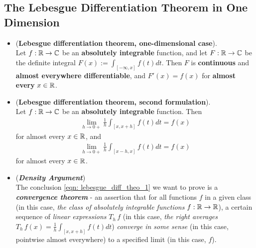 \documentclass[11pt]{article}
\begin{document}
\subsection{The Lebesgue Differentiation Theorem in One Dimension}
\begin{itemize}
\item \begin{theorem} (\textbf{Lebesgue differentiation theorem, one-dimensional case}). \\
Let $f: {\mathbb R} \rightarrow {\mathbb C}$ be an \textbf{absolutely integrable} function, and let $F: {\mathbb R} \rightarrow {\mathbb C}$ be the definite integral $F(x) := \int_{[-\infty,x]} f(t) dt$. Then $F$ is \textbf{continuous} and \textbf{almost everywhere differentiable}, and $F'(x) = f(x)$ for \textbf{almost every} $x \in {\mathbb R}$.
\end{theorem}

\item \begin{theorem} (\textbf{Lebesgue differentiation theorem, second formulation}). \\
Let $f: {\mathbb R} \rightarrow {\mathbb C}$ be an \textbf{absolutely integrable} function. Then
\begin{align}
 \lim\limits_{h\rightarrow 0+}\frac{1}{h} \int_{[x,x+h]} f(t) dt = f(x) \label{eqn: lebesgue_diff_theo_1}
\end{align} for almost every $x \in {\mathbb R}$, and
\begin{align}
 \lim\limits_{h\rightarrow 0+}\frac{1}{h} \int_{[x-h,x]} f(t) dt = f(x) \label{eqn: lebesgue_diff_theo_2}
\end{align} for almost every $x \in {\mathbb R}$.
\end{theorem}

\item \begin{remark} (\emph{\textbf{Density Argument}}) \citep{tao2011introduction} \\
The conclusion \eqref{eqn: lebesgue_diff_theo_1} we want to prove is a \emph{\textbf{convergence theorem}} - an assertion that for all functions $f$ in a given class (in this case, \emph{the class of absolutely integrable functions} $f : {\mathbb R} \rightarrow {\mathbb R}$), a certain sequence of \emph{linear expressions} $T_h\,f$ (in this case, \textit{the right averages} $T_h\,f(x) = \frac{1}{h} \int_{[x,x+h]} f(t) dt$) \emph{converge in some sense} (in this case, pointwise almost everywhere) to a specified limit (in this case, $f$).


\end{remark}
\end{itemize}
\end{document}
